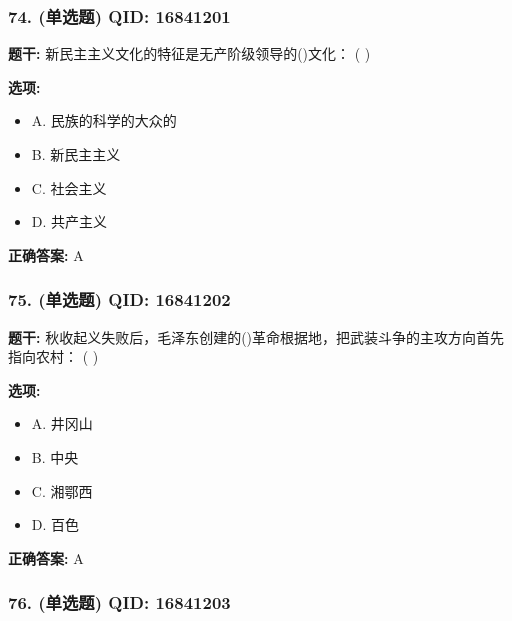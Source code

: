 \documentclass[12pt,UTF8]{ctexart}
\begin{document}
\subsubsection*{74. (单选题) \small QID: 16841201}

\textbf{题干:}
新民主主义文化的特征是无产阶级领导的()文化： ( )

\textbf{选项:}
\begin{itemize}[leftmargin=*]

  \item A. 民族的科学的大众的

  \item B. 新民主主义

  \item C. 社会主义

  \item D. 共产主义

\end{itemize}

\textbf{正确答案:}
A

\vspace{0.3em}\hrulefill\vspace{0.7em}

\subsubsection*{75. (单选题) \small QID: 16841202}

\textbf{题干:}
秋收起义失败后，毛泽东创建的()革命根据地，把武装斗争的主攻方向首先指向农村： ( )

\textbf{选项:}
\begin{itemize}[leftmargin=*]

  \item A. 井冈山

  \item B. 中央

  \item C. 湘鄂西

  \item D. 百色

\end{itemize}

\textbf{正确答案:}
A

\vspace{0.3em}\hrulefill\vspace{0.7em}

\subsubsection*{76. (单选题) \small QID: 16841203}
\end{document}
